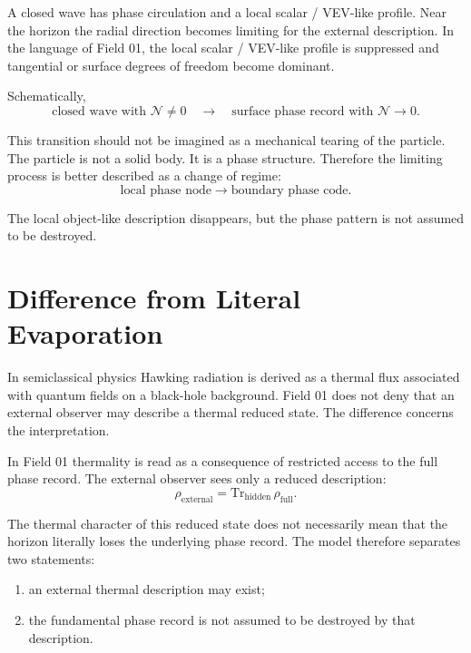 \documentclass[11pt,a4paper]{article}
\newcommand{\normal}{\mathcal{N}}
\begin{document}
A closed wave has phase circulation and a local scalar / VEV-like profile. Near the horizon the radial direction becomes limiting for the external description. In the language of Field 01, the local scalar / VEV-like profile is suppressed and tangential or surface degrees of freedom become dominant.

Schematically,
\begin{equation}
\text{closed wave with } \normal \neq 0
\quad \longrightarrow \quad
\text{surface phase record with } \normal \to 0.
\end{equation}

This transition should not be imagined as a mechanical tearing of the particle. The particle is not a solid body. It is a phase structure. Therefore the limiting process is better described as a change of regime:
\begin{equation}
\text{local phase node} \longrightarrow \text{boundary phase code}.
\end{equation}

The local object-like description disappears, but the phase pattern is not assumed to be destroyed.

\section{Difference from Literal Evaporation}

In semiclassical physics Hawking radiation is derived as a thermal flux associated with quantum fields on a black-hole background. Field 01 does not deny that an external observer may describe a thermal reduced state. The difference concerns the interpretation.

In Field 01 thermality is read as a consequence of restricted access to the full phase record. The external observer sees only a reduced description:
\begin{equation}
\rho_{\mathrm{external}} = \mathrm{Tr}_{\mathrm{hidden}}\, \rho_{\mathrm{full}}.
\end{equation}

The thermal character of this reduced state does not necessarily mean that the horizon literally loses the underlying phase record. The model therefore separates two statements:
\begin{enumerate}
\item an external thermal description may exist;
\item the fundamental phase record is not assumed to be destroyed by that description.
\end{enumerate}
\end{document}
